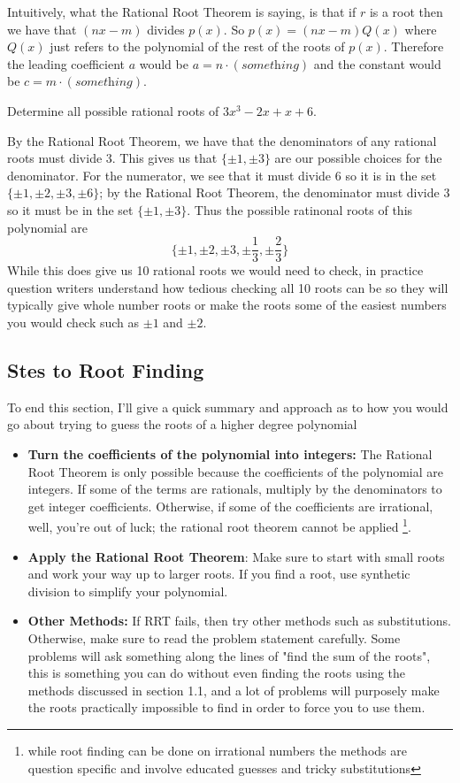 \documentclass[11pt]{article}
\begin{document}
Intuitively, what the Rational Root Theorem is saying, is that if $r$ is a root then we have that $(nx-m)$ divides $p(x)$. So $p(x) = (nx-m)Q(x)$ where $Q(x)$ just refers to the polynomial of the rest of the roots of $p(x)$. Therefore the leading coefficient $a$ would be $ a= n \cdot (\textit{something})$ and the constant would be $ c= m \cdot (\textit{something})$. 
\begin{example}
Determine all possible rational roots of $3x^3-2x+x+6$.
\end{example}
By the Rational Root Theorem, we have that the denominators of any rational roots must divide 3. This gives us that $\{\pm 1, \pm 3\}$ are our possible choices for the denominator. For the numerator, we see that it must divide 6 so it is in the set $\{ \pm 1,\pm 2, \pm 3, \pm6\}$;  by the Rational Root Theorem, the denominator must divide $3$ so it must be in the set $\{\pm 1, \pm 3 \}$. Thus the possible ratinonal roots of this polynomial are
\[
 \{ \pm 1, \pm 2, \pm 3,\pm \frac{1}{3}, \pm \frac{2}{3} \}
\]
While this does give us 10 rational roots we would need to check, in practice question writers understand how tedious checking all 10 roots can be so they will typically give whole number roots or make the roots some of the easiest numbers you would check such as $\pm 1$ and $\pm 2$.

\subsection*{Stes to Root Finding}
To end this section, I'll give a quick summary and approach as to how you would go about trying to guess the roots of a higher degree polynomial
\begin{itemize}
    \item \textbf{Turn the coefficients of the polynomial into integers:} The Rational Root Theorem is only possible because the coefficients of the polynomial are integers. If some of the terms are rationals, multiply by the denominators to get integer coefficients. Otherwise, if some of the coefficients are irrational, well, you're out of luck; the rational root theorem cannot be applied \footnote{while root finding can be done on irrational numbers the methods are question specific and involve educated guesses and tricky substitutions}.
    \item \textbf{Apply the Rational Root Theorem}: Make sure to start with small roots and work your way up to larger roots. If you find a root, use synthetic division to simplify your polynomial.
    \item \textbf{Other Methods:} If RRT fails, then try other methods such as substitutions. Otherwise, make sure to read the problem statement carefully. Some problems will ask something along the lines of "find the sum of the roots", this is something you can do without even finding the roots using the methods discussed in section 1.1, and a lot of problems will purposely make the roots practically impossible to find in order to force you to use them.
\end{itemize}
\end{document}
